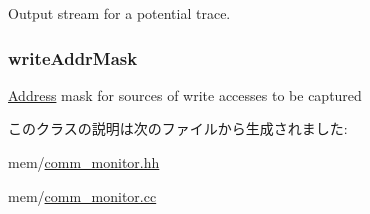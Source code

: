 \label{classCommMonitor_afcb6a80c2432e45a3730484625ee1d20}
Output stream for a potential trace. \hypertarget{classCommMonitor_aed61db18cf47a6b2d34ba6179dd19b40}{
\subsubsection[{writeAddrMask}]{ {\bf writeAddrMask}}}
\label{classCommMonitor_aed61db18cf47a6b2d34ba6179dd19b40}
\hyperlink{classAddress}{Address} mask for sources of write accesses to be captured 

このクラスの説明は次のファイルから生成されました:\begin{DoxyCompactItemize}
\item 
mem/\hyperlink{comm__monitor_8hh}{comm\_\-monitor.hh}\item 
mem/\hyperlink{comm__monitor_8cc}{comm\_\-monitor.cc}\end{DoxyCompactItemize}
